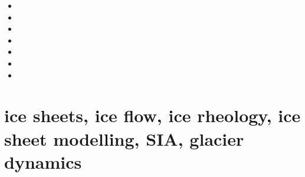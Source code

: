 \begin{small}
\begin{itemize}
\item[1984]
\item[1986]
\item[1993]
\item[2003]
\item[2013]
\item[2014] 
\item[2022]
\end{itemize}
\end{small}



\section{ice sheets, ice flow, ice rheology, ice sheet modelling, SIA, glacier dynamics}

